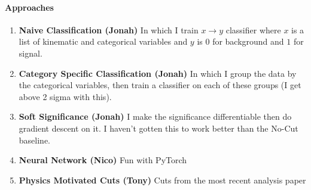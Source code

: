 \documentclass[11pt]{article}
\begin{document}
\paragraph{Approaches}
\begin{enumerate}
\item {\bf Naive Classification (Jonah)}
In which I train $x \rightarrow y$ classifier where $x$ is a list of kinematic and categorical variables and $y$ is $0$ for background and $1$ for signal.

\item {\bf Category Specific Classification (Jonah)}
In which I group the data by the categorical variables, then train a classifier on each of these groups (I get above 2 sigma with this).

\item {\bf Soft Significance (Jonah)}
I make the significance differentiable then do gradient descent on it. I haven't gotten this to work better than the No-Cut baseline.

\item {\bf Neural Network (Nico)}
Fun with PyTorch

\item {\bf Physics Motivated Cuts (Tony)}
Cuts from the most recent analysis paper

\end{enumerate}
\end{document}
